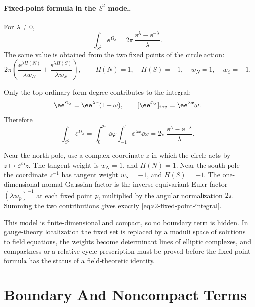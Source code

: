 \paragraph{Fixed-point formula in the \(S^2\) model.}
For \(\lambda\ne0\),
\begin{equation}
  \int_{S^2}\ee^{\Omega_\lambda}
  =
  2\pi\,\frac{\ee^\lambda-\ee^{-\lambda}}{\lambda}.
  \label{eq:s2-fixed-point-integral}
\end{equation}
The same value is obtained from the two fixed points of the circle action:
\[
  2\pi
  \left(
    \frac{\ee^{\lambda H(N)}}{\lambda w_N}
    +
    \frac{\ee^{\lambda H(S)}}{\lambda w_S}
  \right),
  \qquad
  H(N)=1,\quad H(S)=-1,\quad w_N=1,\quad w_S=-1 .
\]

Only the top ordinary form degree contributes to the integral:
\[
  \ee^{\Omega_\lambda}
  =
  \ee^{\lambda x}(1+\omega),
  \qquad
  [\ee^{\Omega_\lambda}]_{\rm top}
  =
  \ee^{\lambda x}\omega .
\]
Therefore
\[
  \int_{S^2}\ee^{\Omega_\lambda}
  =
  \int_0^{2\pi}\dd\varphi
  \int_{-1}^{1}\ee^{\lambda x}\dd x
  =
  2\pi\,\frac{\ee^\lambda-\ee^{-\lambda}}{\lambda}.
\]

Near the north pole, use a complex coordinate \(z\) in which the circle acts
by \(z\mapsto\ee^{\ii\alpha}z\).  The tangent weight is \(w_N=1\), and
\(H(N)=1\).  Near the south pole the coordinate \(z^{-1}\) has tangent weight
\(w_S=-1\), and \(H(S)=-1\).  The one-dimensional normal Gaussian factor is
the inverse equivariant Euler factor \((\lambda w_p)^{-1}\) at each fixed
point \(p\), multiplied by the angular normalization \(2\pi\).  Summing the
two contributions gives exactly \eqref{eq:s2-fixed-point-integral}.

This model is finite-dimensional and compact, so no boundary term is hidden.
In gauge-theory localization the fixed set is replaced by a moduli space of
solutions to field equations, the weights become determinant lines of
elliptic complexes, and compactness or a relative-cycle prescription must be
proved before the fixed-point formula has the status of a field-theoretic
identity.

\section{Boundary And Noncompact Terms}

